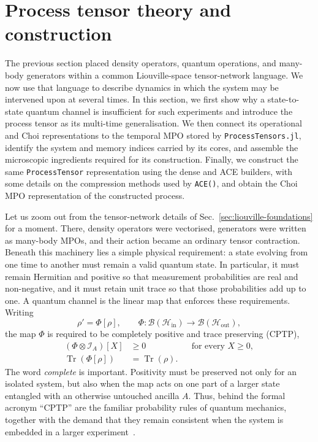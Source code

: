 \section{Process tensor theory and construction}
\label{sec:process-tensors}

The previous section placed density operators, quantum operations, and many-body generators within a common Liouville-space tensor-network language.
We now use that language to describe dynamics in which the system may be intervened upon at several times.
In this section, we first show why a state-to-state quantum channel is insufficient for such experiments and introduce the process tensor as its multi-time generalisation.
We then connect its operational and Choi representations to the temporal MPO stored by \texttt{ProcessTensors.jl}, identify the system and memory indices carried by its cores, and assemble the microscopic ingredients required for its construction.
Finally, we construct the same \texttt{ProcessTensor} representation using the dense and ACE builders, with some details on the compression methods used by \texttt{ACE()}, and obtain the Choi MPO representation of the constructed process.

\label{subsec:from-channels}

Let us zoom out from the tensor-network details of Sec.~\ref{sec:liouville-foundations} for a moment.
There, density operators were vectorised, generators were written as many-body MPOs, and their action became an ordinary tensor contraction.
Beneath this machinery lies a simple physical requirement: a state evolving from one time to another must remain a valid quantum state.
In particular, it must remain Hermitian and positive so that measurement probabilities are real and non-negative, and it must retain unit trace so that those probabilities add up to one.
A quantum channel is the linear map that enforces these requirements.
Writing
%
\begin{equation}
    \rho'
    = \Phi[\rho], \qquad \Phi: \mathcal B(\mathcal H_{ \mathrm{in}}) \longrightarrow \mathcal B(\mathcal H_{ \mathrm{out}}),
\end{equation}
%
the map \(\Phi\) is required to be completely positive and trace preserving (CPTP),
%
\begin{align}
    (\Phi\otimes\mathcal I_A)[X] &\geq 0
    &&\text{for every }X\geq0,
    \label{eq:channel-complete-positivity}\\
    \operatorname{Tr}\!\left(\Phi[\rho]\right)
    &= \operatorname{Tr}(\rho).
    \label{eq:channel-trace-preservation}
\end{align}
%
The word \emph{complete} is important.
Positivity must be preserved not only for an isolated system, but also when the map acts on one part of a larger state entangled with an otherwise untouched ancilla \(A\).
Thus, behind the formal acronym ``CPTP'' are the familiar probability rules of quantum mechanics, together with the demand that they remain consistent when the system is embedded in a larger experiment~\cite{Taranto2025}.

